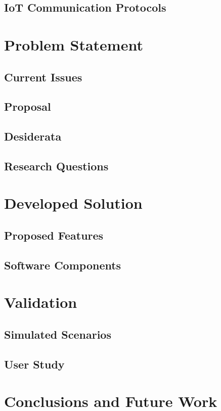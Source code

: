 \documentclass[runningheads]{llncs}
\begin{document}
\subsection{IoT Communication Protocols}

\section{Problem Statement}
\subsection{Current Issues}
\subsection{Proposal}
\subsection{Desiderata}
\subsection{Research Questions}

\section{Developed Solution}
\subsection{Proposed Features}
\subsection{Software Components}

\section{Validation}
\subsection{Simulated Scenarios}
\subsection{User Study}

\section{Conclusions and Future Work}
\end{document}
